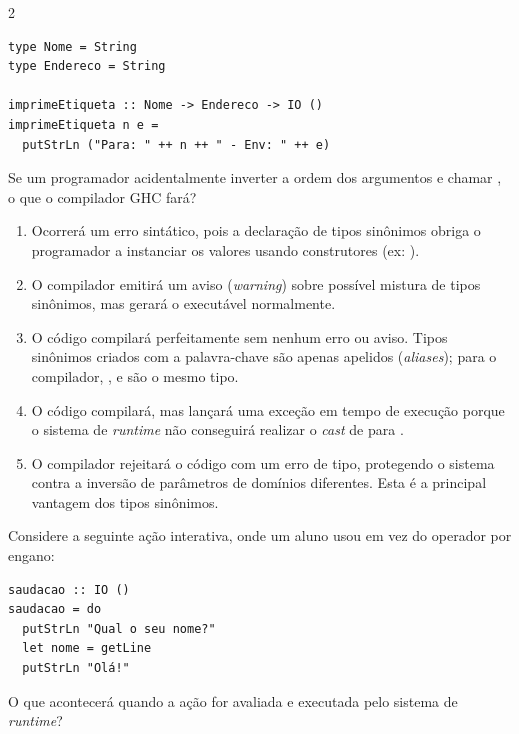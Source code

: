 \documentclass[a4paper,10pt,brazil]{article}
\begin{document}
\begin{multicols}{2}
\begin{verbatim}
type Nome = String
type Endereco = String

imprimeEtiqueta :: Nome -> Endereco -> IO ()
imprimeEtiqueta n e =
  putStrLn ("Para: " ++ n ++ " - Env: " ++ e)
\end{verbatim}

Se um programador acidentalmente inverter a ordem dos argumentos e chamar , o que o compilador GHC fará?

\begin{enumerate}
  \item Ocorrerá um erro sintático, pois a declaração de tipos sinônimos obriga o programador a instanciar os valores usando construtores (ex: ).

  \item O compilador emitirá um aviso (\emph{warning}) sobre possível mistura de tipos sinônimos, mas gerará o executável normalmente.

  \item O código compilará perfeitamente sem nenhum erro ou aviso. Tipos sinônimos criados com a palavra-chave  são apenas apelidos (\emph{aliases}); para o compilador, ,  e  são o mesmo tipo.

  \item O código compilará, mas lançará uma exceção em tempo de execução porque o sistema de \emph{runtime} não conseguirá realizar o \emph{cast} de  para .

  \item O compilador rejeitará o código com um erro de tipo, protegendo o sistema contra a inversão de parâmetros de domínios diferentes. Esta é a principal vantagem dos tipos sinônimos.


\end{enumerate}

Considere a seguinte ação interativa, onde um aluno usou  em vez do operador \haskellinline{<-} por engano:

\begin{verbatim}
saudacao :: IO ()
saudacao = do
  putStrLn "Qual o seu nome?"
  let nome = getLine
  putStrLn "Olá!"
\end{verbatim}

O que acontecerá quando a ação  for avaliada e executada pelo sistema de \emph{runtime}?


\end{multicols}
\end{document}
